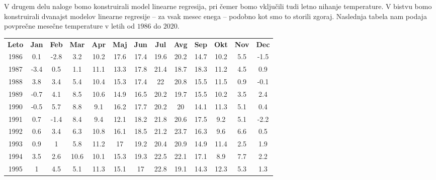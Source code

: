 \documentclass{article}
\begin{document}
V drugem delu naloge bomo konstruirali model linearne regresija, pri čemer bomo vključili tudi letno nihanje temperature. 
V bistvu bomo konstruirali dvanajst modelov linearne regresije -- za vsak mesec enega -- podobno kot smo to storili zgoraj.
Naslednja tabela nam podaja povprečne mesečne temperature v letih od $1986$ do $2020$.
\begin{table}[H]
    \centering
    \begin{tabular}{c c c c c c c c c c c c c}
        \bf{Leto}  &	\bf{Jan}  &  \bf{Feb}  &  \bf{Mar}  &  \bf{Apr}  &  \bf{Maj}  &  \bf{Jun}  &  \bf{Jul}  &  \bf{Avg}  &  \bf{Sep}  &  \bf{Okt}  &  \bf{Nov}  &  \bf{Dec}  \\
        1986  &  0.1    &  -2.8  &  3.2   &  10.2  &  17.6  &  17.4  &  19.6  &  20.2  &  14.7  &  10.2  &  5.5  &  -1.5   \\                             
        1987  &  -3.4   &  0.5   &  1.1   &  11.1  &  13.3  &  17.8  &  21.4  &  18.7  &  18.3  &  11.2  &  4.5  &  0.9    \\                           
        1988  &  3.8    &  3.4   &  5.4   &  10.4  &  15.3  &  17.4  &  22    &  20.8  &  15.5  &  11.5  &  0.9  &  -0.1   \\                          	
        1989  &  -0.7   &  4.1   &  8.5   &  10.6  &  14.9  &  16.5  &  20.2  &  19.7  &  15.5  &  10.2  &  3.5  &  2.4    \\                           	
        1990  &  -0.5   &  5.7   &  8.8   &  9.1   &  16.2  &  17.7  &  20.2  &  20    &  14.1  &  11.3  &  5.1  &  0.4    \\                        	
        1991  &  0.7    &  -1.4  &  8.4   &  9.4   &  12.1  &  18.2  &  21.8  &  20.6  &  17.5  &  9.2   &  5.1  &  -2.2   \\                           
        1992  &  0.6    &  3.4   &  6.3   &  10.8  &  16.1  &  18.5  &  21.2  &  23.7  &  16.3  &  9.6   &  6.6  &  0.5    \\                          	
        1993  &  0.9    &  1     &  5.8   &  11.2  &  17    &  19.2  &  20.4  &  20.9  &  14.9  &  11.4  &  2.5  &  1.9    \\                       	
        1994  &  3.5    &  2.6   &  10.6  &  10.1  &  15.3  &  19.3  &  22.5  &  22.1  &  17.1  &  8.9   &  7.7  &  2.2    \\                           	
        1995  &  1   	&  4.5   &  5.1   &  11.3  &  15.1  &  17    &  22.8  &  19.1  &  14.3  &  12.3  &  5.3  &  1.3    \\                        

\end{tabular}
\end{table}
\end{document}
